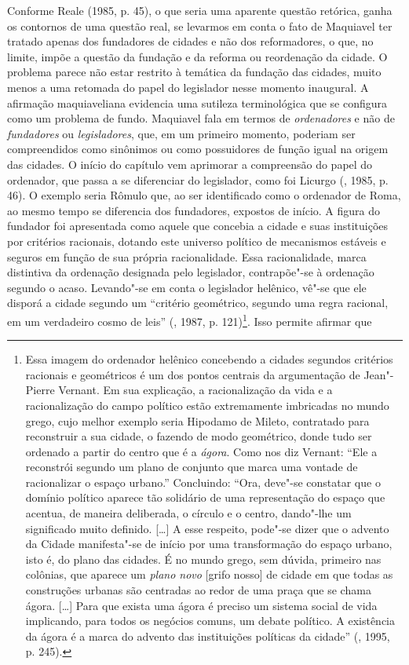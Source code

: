 Conforme Reale (1985, p. 45), o que seria uma aparente questão retórica,
ganha os contornos de uma questão real, se levarmos em conta o fato de
Maquiavel ter tratado apenas dos fundadores de cidades e não dos
reformadores, o que, no limite, impõe a questão da fundação e da reforma
ou reordenação da cidade. O problema parece não estar restrito à
temática da fundação das cidades, muito menos a uma retomada do papel do
legislador nesse momento inaugural. A afirmação maquiaveliana evidencia
uma sutileza terminológica que se configura como um problema de fundo.
Maquiavel fala em termos de \emph{ordenadores} e não de
\emph{fundadores} ou \emph{legisladores}, que, em um primeiro momento,
poderiam ser compreendidos como sinônimos ou como possuidores de função
igual na origem das cidades. O início do capítulo vem aprimorar a
compreensão do papel do ordenador, que passa a se diferenciar do
legislador, como foi Licurgo (, 1985, p. 46). O exemplo seria
Rômulo que, ao ser identificado como o ordenador de Roma, ao mesmo tempo
se diferencia dos fundadores, expostos de início. A figura do fundador
foi apresentada como aquele que concebia a cidade e suas instituições
por critérios racionais, dotando este universo político de mecanismos
estáveis e seguros em função de sua própria racionalidade. Essa
racionalidade, marca distintiva da ordenação designada pelo legislador,
contrapõe"-se à ordenação segundo o acaso. Levando"-se em conta o
legislador helênico, vê"-se que ele disporá a cidade segundo um
``critério geométrico, segundo uma regra racional, em um verdadeiro
cosmo de leis'' (, 1987, p. 121)\footnote{Essa imagem do ordenador
  helênico concebendo a cidades segundos critérios racionais e
  geométricos é um dos pontos centrais da argumentação de Jean"-Pierre
  Vernant. Em sua explicação, a racionalização da vida e a
  racionalização do campo político estão extremamente imbricadas no
  mundo grego, cujo melhor exemplo seria Hipodamo de Mileto, contratado
  para reconstruir a sua cidade, o fazendo de modo geométrico, donde
  tudo ser ordenado a partir do centro que é a \emph{ágora}. Como nos
  diz Vernant: ``Ele a reconstrói segundo um plano de conjunto que marca
  uma vontade de racionalizar o espaço urbano.'' Concluindo: ``Ora,
  deve"-se constatar que o domínio político aparece tão solidário de uma
  representação do espaço que acentua, de maneira deliberada, o círculo
  e o centro, dando"-lhe um significado muito definido. {[}\ldots{}{]} A esse
  respeito, pode"-se dizer que o advento da Cidade manifesta"-se de início
  por uma transformação do espaço urbano, isto é, do plano das cidades.
  É no mundo grego, sem dúvida, primeiro nas colônias, que aparece um
  \emph{plano novo} {[}grifo nosso{]} de cidade em que todas as
  construções urbanas são centradas ao redor de uma praça que se chama
  ágora. {[}\ldots{}{]} Para que exista uma ágora é preciso um sistema social
  de vida implicando, para todos os negócios comuns, um debate político.
  A existência da ágora é a marca do advento das instituições políticas
  da cidade'' (, 1995, p. 245).}. Isso permite afirmar que
